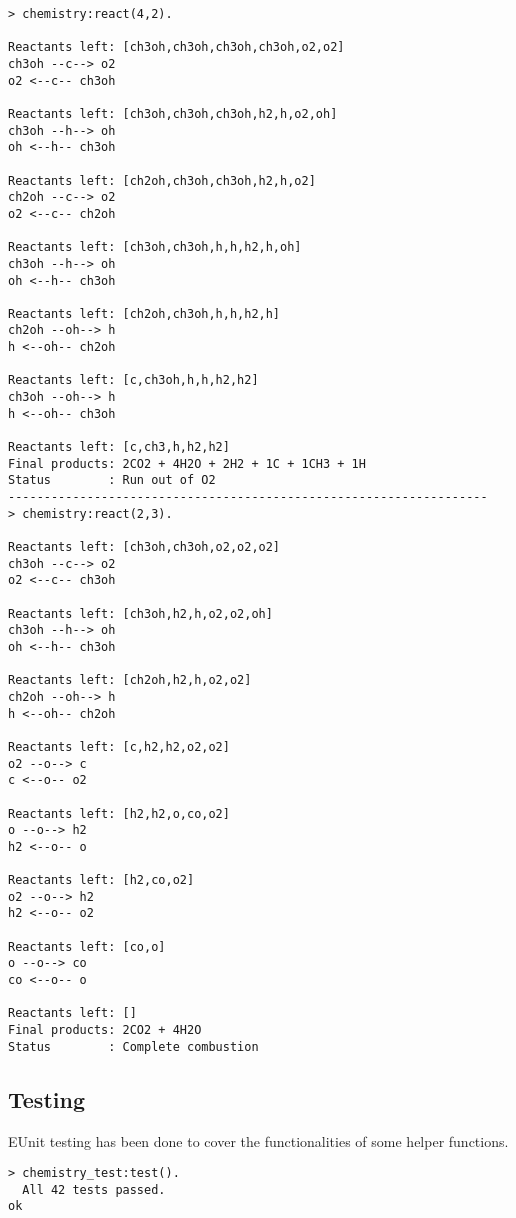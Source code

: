 \documentclass[12pt, a4paper]{article}
\begin{document}
\begin{lstlisting}[basicstyle=\ttfamily\small, label=traces,caption=Traces of the system]
> chemistry:react(4,2).

Reactants left: [ch3oh,ch3oh,ch3oh,ch3oh,o2,o2]
ch3oh --c--> o2
o2 <--c-- ch3oh

Reactants left: [ch3oh,ch3oh,ch3oh,h2,h,o2,oh]
ch3oh --h--> oh
oh <--h-- ch3oh

Reactants left: [ch2oh,ch3oh,ch3oh,h2,h,o2]
ch2oh --c--> o2
o2 <--c-- ch2oh

Reactants left: [ch3oh,ch3oh,h,h,h2,h,oh]
ch3oh --h--> oh
oh <--h-- ch3oh

Reactants left: [ch2oh,ch3oh,h,h,h2,h]
ch2oh --oh--> h
h <--oh-- ch2oh

Reactants left: [c,ch3oh,h,h,h2,h2]
ch3oh --oh--> h
h <--oh-- ch3oh

Reactants left: [c,ch3,h,h2,h2]
Final products: 2CO2 + 4H2O + 2H2 + 1C + 1CH3 + 1H
Status        : Run out of O2
-------------------------------------------------------------------
> chemistry:react(2,3).

Reactants left: [ch3oh,ch3oh,o2,o2,o2]
ch3oh --c--> o2
o2 <--c-- ch3oh

Reactants left: [ch3oh,h2,h,o2,o2,oh]
ch3oh --h--> oh
oh <--h-- ch3oh

Reactants left: [ch2oh,h2,h,o2,o2]
ch2oh --oh--> h
h <--oh-- ch2oh

Reactants left: [c,h2,h2,o2,o2]
o2 --o--> c
c <--o-- o2

Reactants left: [h2,h2,o,co,o2]
o --o--> h2
h2 <--o-- o

Reactants left: [h2,co,o2]
o2 --o--> h2
h2 <--o-- o2

Reactants left: [co,o]
o --o--> co
co <--o-- o

Reactants left: []
Final products: 2CO2 + 4H2O
Status        : Complete combustion
\end{lstlisting}

\subsection{Testing}
EUnit testing has been done to cover the functionalities of some helper functions.

\begin{lstlisting}[basicstyle=\ttfamily\small,caption=EUnit testing]
> chemistry_test:test().
  All 42 tests passed.
ok
\end{lstlisting}
\end{document}
